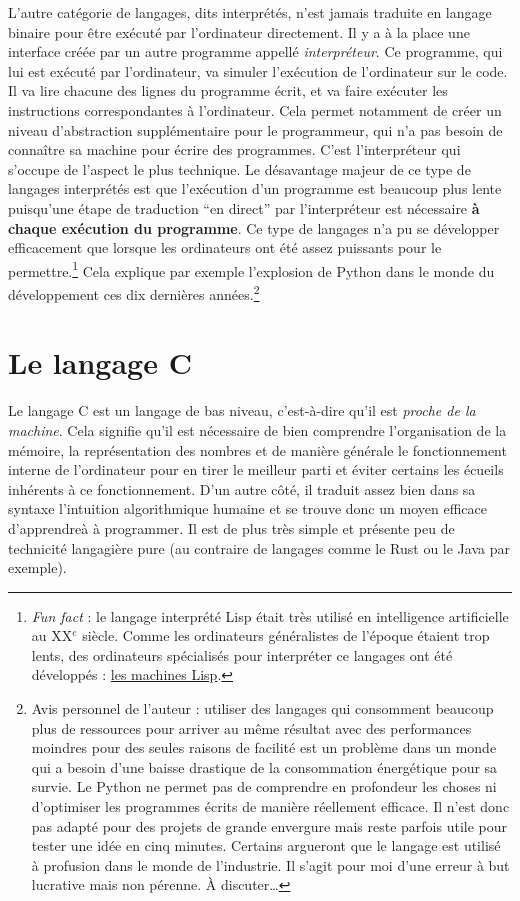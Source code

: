 \documentclass[../../main.tex]{subfiles}
\begin{document}
L'autre catégorie de langages, dits interprétés, n'est jamais traduite en langage binaire pour être exécuté par l'ordinateur directement. Il y a à la place une interface créée par un autre programme appellé \textit{interpréteur}. Ce programme, qui lui est exécuté par l'ordinateur, va simuler l'exécution de l'ordinateur sur le code. Il va lire chacune des lignes du programme écrit, et va faire exécuter les instructions correspondantes à l'ordinateur. Cela permet notamment de créer un niveau d'abstraction supplémentaire pour le programmeur, qui n'a pas besoin de connaître sa machine pour écrire des programmes. C'est l'interpréteur qui s'occupe de l'aspect le plus technique. Le désavantage majeur de ce type de langages interprétés est que l'exécution d'un programme est beaucoup plus lente puisqu'une étape de traduction ``en direct'' par l'interpréteur est nécessaire \textbf{à chaque exécution du programme}. Ce type de langages n'a pu se développer efficacement que lorsque les ordinateurs ont été assez puissants pour le permettre.\footnote{\textit{Fun fact} : le langage interprété Lisp était très utilisé en intelligence artificielle au XX$^e$ siècle. Comme les ordinateurs généralistes de l'époque étaient trop lents, des ordinateurs spécialisés pour interpréter ce langages ont été développés : \href{https://fr.wikipedia.org/wiki/Machine_Lisp}{les machines Lisp}.} Cela explique par exemple l'explosion de Python dans le monde du développement ces dix dernières années.\footnote{Avis personnel de l'auteur : utiliser des langages qui consomment beaucoup plus de ressources pour arriver au même résultat avec des performances moindres pour des seules raisons de facilité est un problème dans un monde qui a besoin d'une baisse drastique de la consommation énergétique pour sa survie. Le Python ne permet pas de comprendre en profondeur les choses ni d'optimiser les programmes écrits de manière réellement efficace. Il n'est donc pas adapté pour des projets de grande envergure mais reste parfois utile pour tester une idée en cinq minutes. Certains argueront que le langage est utilisé à profusion dans le monde de l'industrie. Il s'agit pour moi d'une erreur à but lucrative mais non pérenne. À discuter\dots}
\section{Le langage C}
Le langage C est un langage de bas niveau, c'est-à-dire qu'il est \textit{proche de la machine}. Cela signifie qu’il est nécessaire de bien comprendre l’organisation de la mémoire, la représentation des nombres et de manière générale le fonctionnement interne de l'ordinateur pour en tirer le meilleur parti et éviter certains les écueils inhérents à ce fonctionnement. D'un autre côté, il traduit assez bien dans sa syntaxe l'intuition algorithmique humaine et se trouve donc un moyen efficace d'apprendreà à programmer. Il est de plus très simple et présente peu de technicité langagière pure (au contraire de langages comme le Rust ou le Java par exemple).
\end{document}
